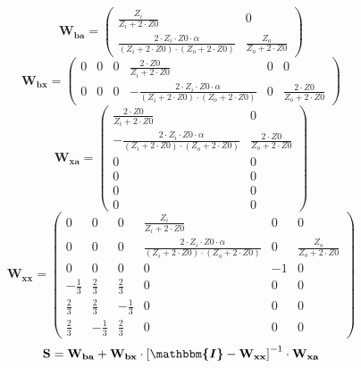 \[ \mathbf{W_{ba}} = \left(\begin{smallmatrix} \frac{Z_i}{Z_i+2\cdot
Z0} & 0 \\ \frac{2\cdot Z_i\cdot Z0\cdot \alpha}{ (Z_i+2\cdot Z0
)\cdot (Z_o+2\cdot Z0 )} & \frac{Z_o}{Z_o+2\cdot Z0}
\end{smallmatrix}\right) \]
\[ \mathbf{W_{bx}} = \left(\begin{smallmatrix} 0 & 0 & 0 &
\frac{2\cdot Z0}{Z_i+2\cdot Z0} & 0 & 0 \\ 0 & 0 & 0 & -\frac{2\cdot
Z_i\cdot Z0\cdot \alpha}{ (Z_i+2\cdot Z0 )\cdot (Z_o+2\cdot Z0 )} & 0
& \frac{2\cdot Z0}{Z_o+2\cdot Z0} \end{smallmatrix}\right) \]
\[ \mathbf{W_{xa}} = \left(\begin{smallmatrix} \frac{2\cdot
Z0}{Z_i+2\cdot Z0} & 0 \\ -\frac{2\cdot Z_i\cdot Z0\cdot \alpha}{
(Z_i+2\cdot Z0 )\cdot (Z_o+2\cdot Z0 )} & \frac{2\cdot Z0}{Z_o+2\cdot
Z0} \\ 0 & 0 \\ 0 & 0 \\ 0 & 0 \\ 0 & 0 \end{smallmatrix}\right) \]
\[ \mathbf{W_{xx}} = \left(\begin{smallmatrix} 0 & 0 & 0 &
\frac{Z_i}{Z_i+2\cdot Z0} & 0 & 0 \\ 0 & 0 & 0 & \frac{2\cdot Z_i\cdot
Z0\cdot \alpha}{ (Z_i+2\cdot Z0 )\cdot (Z_o+2\cdot Z0 )} & 0 &
\frac{Z_o}{Z_o+2\cdot Z0} \\ 0 & 0 & 0 & 0 & -1 & 0 \\ -\frac{1}{3} &
\frac{2}{3} & \frac{2}{3} & 0 & 0 & 0 \\ \frac{2}{3} & \frac{2}{3} &
-\frac{1}{3} & 0 & 0 & 0 \\ \frac{2}{3} & -\frac{1}{3} & \frac{2}{3} &
0 & 0 & 0 \end{smallmatrix}\right) \]
\[ \mathbf{S}=\mathbf{W_{ba}}+\mathbf{W_{bx}}\cdot\left[
\boldsymbol{\mathbbm{I}}
-\mathbf{W_{xx}}\right]^{-1}\cdot\mathbf{W_{xa}} \]
